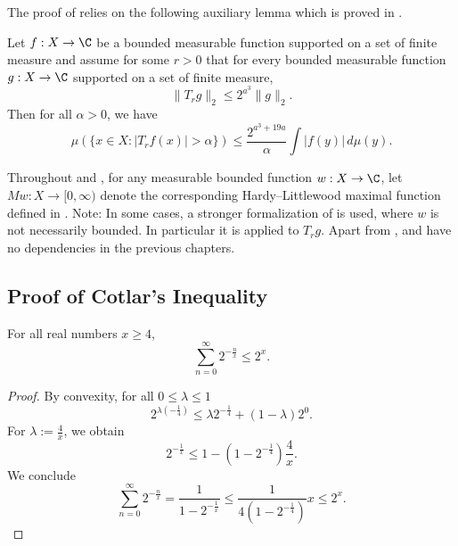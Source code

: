 The proof of  relies on the following auxiliary lemma which is proved in .
\begin{lemma}
    \label{calderon-zygmund-weak-1-1}
    \leanok
    Let $f:X\to\C$ be a bounded measurable function supported on a set of finite measure and assume for some $r>0$ that for every bounded measurable function $g:X\to\C$ supported on a set of finite measure,
    \begin{equation}
        \label{eq-strong-2-2-assumption}
        \|T_rg\|_{2}\le 2^{a^3} \|g\|_2.
    \end{equation}
    Then for all $\alpha>0$, we have
    \begin{equation}
        \label{eq-weak-1-1}
        \mu\left(\{x\in X: |T_r f(x)|>\alpha\}\right)\le \frac{2^{a^3 + 19a}}{\alpha} \int |f(y)|\, d\mu(y).
    \end{equation}
\end{lemma}
Throughout  and , for any measurable bounded function $w: X \to \C$, let $Mw: X \to [0, \infty)$ denote the corresponding Hardy--Littlewood maximal function defined in .
Note: In some cases, a stronger formalization of  is used, where $w$ is not necessarily bounded. In particular it is applied to $T_rg$.
Apart from ,  and  have no dependencies in the previous chapters.



\subsection{Proof of Cotlar's Inequality}
\label{subsec-cotlar}

\begin{lemma}
    \label{geometric-series-estimate}
    \leanok
    For all real numbers $x\ge 4$,
    \begin{equation*}
        \sum_{n=0}^\infty 2^{-\frac{n}{x}} \le 2^x.
    \end{equation*}
\end{lemma}
\begin{proof}
    \leanok
    By convexity, for all $0\le\lambda\le1$
    \begin{equation*}
        2^{\lambda(-\frac{1}{4})} \le \lambda 2^{-\frac{1}{4}} + (1-\lambda)2^0.
    \end{equation*}
    For $\lambda:=\frac{4}{x}$, we obtain
    \begin{equation*}
        2^{-\frac 1 x} \le 1 - (1-2^{-\frac 1 4}) \frac{4}{x}.
    \end{equation*}
    We conclude
    \begin{equation*}
        \sum_{n=0}^\infty 2^{-\frac{n}{x}} = \frac{1}{1-2^{-\frac 1 x}} \le \frac{1}{4(1-2^{-\frac 1 4})} x \le 2^x.
    \end{equation*}
\end{proof}

